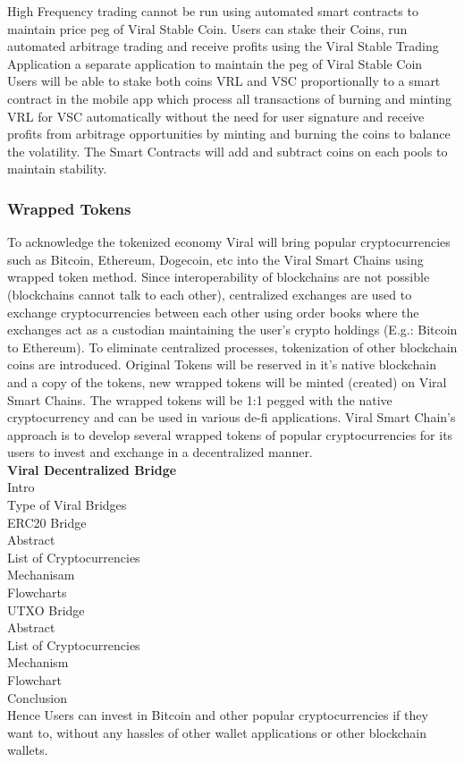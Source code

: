 \documentclass[10pt]{article}
\begin{document}
High Frequency trading cannot be run using automated smart contracts to maintain price peg of Viral Stable Coin. Users can stake their Coins, run automated arbitrage trading and receive profits using the Viral Stable Trading Application a separate application to maintain the peg of Viral Stable Coin\\

Users will be able to stake both coins VRL and VSC proportionally to a smart contract in the mobile app which process all transactions of burning and minting VRL for VSC automatically without the need for user signature and receive profits from arbitrage opportunities by minting and burning the coins to balance the volatility. The Smart Contracts will add and subtract coins on each pools to maintain stability.\\

\subsubsection{Wrapped Tokens}

To acknowledge the tokenized economy Viral will bring popular cryptocurrencies such as Bitcoin, Ethereum, Dogecoin, etc into the Viral Smart Chains using wrapped token method. Since interoperability of blockchains are not possible (blockchains cannot talk to each other), centralized exchanges are used to exchange cryptocurrencies between each other using order books where the exchanges act as a custodian maintaining the user’s crypto holdings (E.g.: Bitcoin to Ethereum). To eliminate centralized processes, tokenization of other blockchain coins are introduced. Original Tokens will be reserved in it's native blockchain and a copy of the tokens, new wrapped tokens will be minted (created) on Viral Smart Chains. The wrapped tokens will be 1:1 pegged with the native cryptocurrency and can be used in various de-fi applications. Viral Smart Chain's approach is to develop several wrapped tokens of popular cryptocurrencies for its users to invest and exchange in a decentralized manner.\\

\textbf{Viral Decentralized Bridge}\\

Intro\\
Type of Viral Bridges\\
ERC20 Bridge\\
Abstract\\
List of Cryptocurrencies\\
Mechanisam\\
Flowcharts\\
UTXO Bridge\\
Abstract\\
List of Cryptocurrencies\\
Mechanism\\
Flowchart\\
Conclusion\\
Hence Users can invest in Bitcoin and other popular cryptocurrencies if they want to, without any hassles of other wallet applications or other blockchain wallets.
\end{document}
